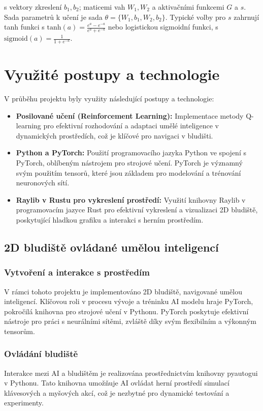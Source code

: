 \documentclass[12pt, a4paper,
twoside,        %
openright
]{report}
\begin{document}
s vektory zkreslení \( b_1, b_2 \); maticemi vah \( W_1, W_2 \) a aktivačními funkcemi \( G \) a \( s \). Sada parametrů k učení je sada \( \theta = \{W_1, b_1, W_2, b_2\} \). Typické volby pro \( s \) zahrnují tanh funkci s \( \text{tanh}(a) = \frac{e^a - e^{-a}}{e^a + e^{-a}} \) nebo logistickou sigmoidní funkci, s \( \text{sigmoid}(a) = \frac{1}{1 + e^{-a}} \).

\chapter{Využité postupy a technologie}
V průběhu projektu byly využity následující postupy a technologie:

\begin{itemize}
	\item \textbf{Posilované učení (Reinforcement Learning):} Implementace metody Q-learning pro efektivní rozhodování a adaptaci umělé inteligence v dynamických prostředích, což je klíčové pro navigaci v bludišti.
	\item \textbf{Python a PyTorch:} Použití programovacího jazyka Python ve spojení s PyTorch, oblíbeným nástrojem pro strojové učení. PyTorch je významný svým použitím tensorů, které jsou základem pro modelování a trénování neuronových sítí.
	\item \textbf{Raylib v Rustu pro vykreslení prostředí:} Využití knihovny Raylib v programovacím jazyce Rust pro efektivní vykreslení a vizualizaci 2D bludiště, poskytující hladkou grafiku a interakci s herním prostředím.
\end{itemize}

\section{2D bludiště ovládané umělou inteligencí}

\subsection{Vytvoření a interakce s prostředím}
V rámci tohoto projektu je implementováno 2D bludiště, navigované umělou inteligencí. Klíčovou roli v procesu vývoje a tréninku AI modelu hraje PyTorch, pokročilá knihovna pro strojové učení v Pythonu. PyTorch poskytuje efektivní nástroje pro práci s neurálními sítěmi, zvláště díky svým flexibilním a výkonným tensorům.

\subsection{Ovládání bludiště}
Interakce mezi AI a bludištěm je realizována prostřednictvím knihovny pyautogui v Pythonu. Tato knihovna umožňuje AI ovládat herní prostředí simulací klávesových a myšových akcí, což je nezbytné pro dynamické testování a experimenty.
\newpage
\end{document}
